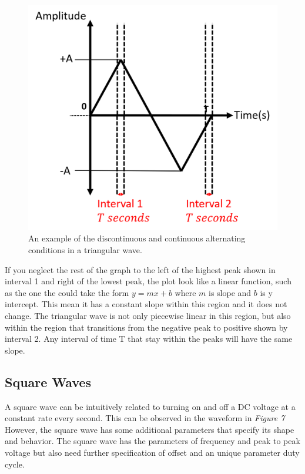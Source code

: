 \documentclass[12pt]{article}
\begin{document}
\begin{figure}[H]
    \centering
    \includegraphics[width=12cm]{photos/prelim/triangle.png}
    \caption{An example of the discontinuous and continuous alternating conditions in a triangular wave.}
\end{figure}

If you neglect the rest of the graph to the left of the highest peak shown in interval 1 and right of the lowest peak, the plot look like a linear function, such as the one the could take the form $y = mx + b$ where $m$ is slope and $b$ is y intercept. This mean it has a constant slope within this region and it does not change. The triangular wave is not only piecewise linear in this region, but also within the region that transitions from the negative peak to positive shown by interval 2. Any interval of time T that stay within the peaks will have the same slope. 

\subsection{Square Waves}

A square wave can be intuitively related to turning on and off a DC voltage at a constant rate every second. This can be observed in the waveform in \textit{Figure 7} However, the square wave has some additional parameters that specify its shape and behavior. The square wave has the parameters of frequency and peak to peak voltage but also need further specification of offset and an unique parameter duty cycle.
\end{document}
